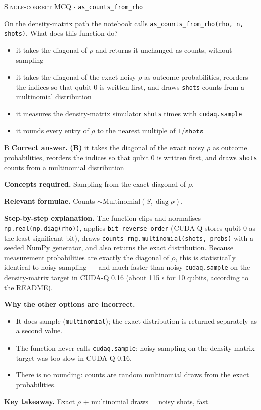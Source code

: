 \documentclass[11pt,a4paper]{article}
\newcommand{\optlabel}[1]{\textbf{(#1)}}
\newcommand{\correctlabel}[1]{\textcolor{okgreen}{\textbf{(#1)}\,\ding{51}}}
\newenvironment{qitem}[1]{\begin{list}{}{\setlength{\leftmargin}{3.3em}\setlength{\labelwidth}{3.1em}%
  \setlength{\labelsep}{0.2em}\setlength{\topsep}{3pt}\setlength{\parsep}{3pt}}\item[\textbf{Q.#1}\hfill]}{\end{list}}
\newcommand{\qsep}{\par\vspace{2pt}{\color{black!15}\hrule}\vspace{4pt}}
\newcommand{\qmeta}[2]{{\footnotesize\color{black!60}\textsc{#1} \;$\cdot$\; #2}\par}
\begin{document}
\begin{qitem}{50}
\qmeta{Single-correct MCQ}{\texttt{as\_counts\_from\_rho}}
On the density-matrix path the notebook calls \texttt{as\_counts\_from\_rho(rho, n, shots)}. What does this function do?
\begin{itemize}[leftmargin=2.6em, labelsep=0.4em, itemsep=2pt, topsep=3pt]
\item[\optlabel{A}] it takes the diagonal of $\rho$ and returns it unchanged as counts, without sampling
\item[\correctlabel{B}] it takes the diagonal of the exact noisy $\rho$ as outcome probabilities, reorders the indices so that qubit 0 is written first, and draws \texttt{shots} counts from a multinomial distribution
\item[\optlabel{C}] it measures the density-matrix simulator \texttt{shots} times with \texttt{cudaq.sample}
\item[\optlabel{D}] it rounds every entry of $\rho$ to the nearest multiple of $1/\texttt{shots}$
\end{itemize}
\end{qitem}
\begin{solbox}{B}
\textbf{\color{brand}Correct answer.} \textcolor{okgreen}{\textbf{(B)}} it takes the diagonal of the exact noisy $\rho$ as outcome probabilities, reorders the indices so that qubit 0 is written first, and draws \texttt{shots} counts from a multinomial distribution

\textbf{\color{brand}Concepts required.} Sampling from the exact diagonal of $\rho$.

\textbf{\color{brand}Relevant formulae.} Counts $\sim\mathrm{Multinomial}(S, \operatorname{diag}\rho)$.

\textbf{\color{brand}Step-by-step explanation.} The function clips and normalises \texttt{np.real(np.diag(rho))}, applies \texttt{bit\_reverse\_order} (CUDA-Q stores qubit 0 as the least significant
bit), draws \texttt{counts\_rng.multinomial(shots, probs)} with a seeded NumPy generator, and also returns the exact distribution. Because measurement
probabilities are exactly the diagonal of $\rho$, this is statistically identical to noisy sampling --- and much faster than noisy \texttt{cudaq.sample} on the
density-matrix target in CUDA-Q 0.16 (about 115 s for 10 qubits, according to the README).

\textbf{\color{brand}Why the other options are incorrect.}
\begin{itemize}[leftmargin=2.4em, itemsep=1pt, topsep=2pt]
\item[\textbf{(A)}] It does sample (\texttt{multinomial}); the exact distribution is returned separately as a second value.
\item[\textbf{(C)}] The function never calls \texttt{cudaq.sample}; noisy sampling on the density-matrix target was too slow in CUDA-Q 0.16.
\item[\textbf{(D)}] There is no rounding: counts are random multinomial draws from the exact probabilities.
\end{itemize}
\textbf{\color{brand}Key takeaway.} Exact $\rho$ + multinomial draws = noisy shots, fast.
\end{solbox}
\qsep
\end{document}

